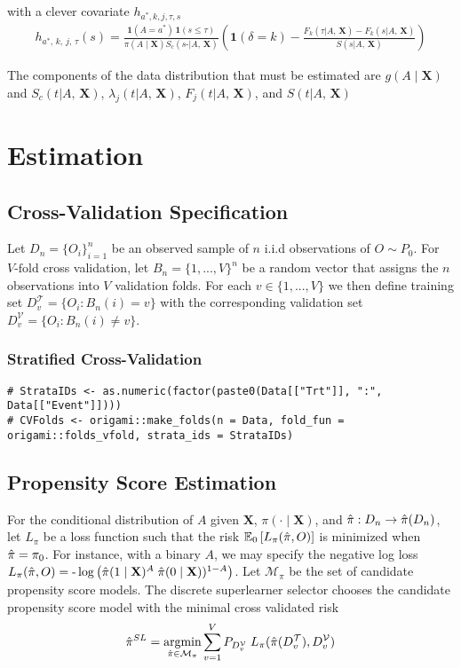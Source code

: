 \documentclass{report}
\newcommand{\1}{\ensuremath{\mathbf{1}}}
\DeclareMathOperator*{\argmin}{argmin}
\newcommand{\X}{\ensuremath{\mathbf{X}}}
\newcommand{\AX}{\ensuremath{\mid A,\,\mathbf{X}}}
\newcommand{\trt}{\ensuremath{a^*}}
\newcommand{\tk}{\ensuremath{\tau}}
\newcommand{\jj}{\ensuremath{k}}
\newcommand{\g}{\ensuremath{\pi}}
\begin{document}
with a clever covariate  $h_{\trt, \jj, j, \tk, s}$ 
\begin{align*}
    h_{\trt,\, \jj,\, j,\, \tk}(s) = \frac{\1(A = \trt)\, \1(s \leq \tk)}{\g(A \mid \X) S_c(s\text{-} \AX)} \left(\1(\delta = \jj) - \frac{F_\jj(\tk \AX) - F_\jj(s \AX)}{S(s \AX)}\right)
\end{align*}

The components of the data distribution that must be estimated are $g(A \mid \X)$ and $S_c(t \AX)$, $\lambda_j(t \AX)$, $F_j(t \AX)$, and $S(t \AX)$

\section*{Estimation}
\label{sec:org2457db7}
\subsection*{Cross-Validation Specification}
\label{sec:org4724a8a}
Let \(D_n = \{O_i\}_{i=1}^n\) be an observed sample of \(n\) i.i.d observations of \(O \sim P_0\). For \(V\text{-fold}\) cross validation, let \(B_n = \{1, ... , V\}^n\) be a random vector that assigns the \(n\) observations into \(V\) validation folds. For each \(v \in \{1, ..., V\}\) we then define training set \(D^\mathcal{T}_v = \{O_i : B_n(i) = v\}\) with the corresponding validation set \(D^\mathcal{V}_v = \{O_i : B_n(i) \neq v\}\).

\subsubsection*{Stratified Cross-Validation}
\label{sec:orgfba338b}

\begin{lstlisting}
# StrataIDs <- as.numeric(factor(paste0(Data[["Trt"]], ":", Data[["Event"]])))
# CVFolds <- origami::make_folds(n = Data, fold_fun = origami::folds_vfold, strata_ids = StrataIDs)
\end{lstlisting}

\subsection*{Propensity Score Estimation}
\label{sec:orgdc8c7a6}

For the conditional distribution of $A$ given $\X$, $\pi(\cdot \mid \X)$, and $\Hat{\pi} : D_n \to \Hat{\pi}(D_n)$, let $L_\pi$ be a loss function such that the risk $\mathbb{E}_0\left[L_\pi(\Hat{\pi}, O)\right]$ is minimized when $\Hat{\pi} = \pi_0$. For instance, with a binary $A$, we may specify the negative log loss $L_\pi(\Hat{\pi}, O) = \text{-}\log\left(\Hat{\pi}(1 \mid \X)^A \; \Hat{\pi}(0 \mid \X))^{1-A}\right)$. Let $\mathcal{M_\pi}$ be the set of candidate propensity score models. The discrete superlearner selector chooses the candidate propensity score model with the minimal cross validated risk 
\[ \Hat{\pi}^{SL} = \argmin_{\Hat{\pi} \in \mathcal{M}_\pi} \sum_{v = 1}^{V} P_{D^\mathcal{V}_v} \; L_\pi(\Hat{\pi}(D^\mathcal{T}_v), D^\mathcal{V}_v)\]
\end{document}
